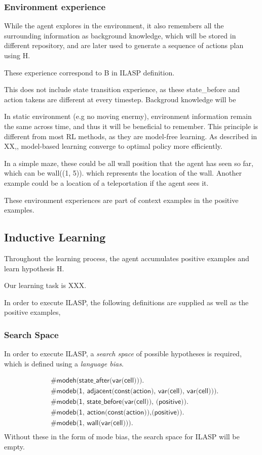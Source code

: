 \subsubsection{Environment experience}

While the agent explores in the environment, it also remembers all the surrounding information as background knowledge, 
which will be stored in different repository, and are later used to generate a sequence of actions plan using H.

These experience correspond to B in ILASP definition. 

This does not include state transition experience, as these state\_before and action takens are different at every timestep.
Backgroud knowledge will be 

In static environment (e.g no moving enermy), environment information remain the same across time, and thus it will be beneficial to remember. 
This principle is different from most RL methods, as they are model-free learning. 
As described in XX,, model-based learning converge to optimal policy more efficiently. 

In a simple maze, these could be all wall position that the agent has seen so far, which can be 
wall((1, 5)). which represents the location of the wall. 
Another example could be a location of a teleportation if the agent sees it. 

These environment experiences are part of context examples in the positive examples. 

\subsection{Inductive Learning}
\label{induction}
Throughout the learning process, the agent accumulates positive examples and learn hypothesis H. 

Our learning task is XXX.

In order to execute ILASP, the following definitions are supplied as well as the positive examples,

\subsubsection{Search Space}
In order to execute ILASP, a \textit{search space} of possible hypotheses is required, which is defined using a \textit{language bias}. 

\begin{equation}
\begin{split}    
&\textsf{\#modeh(state\_after(var(cell))).}\\
&\textsf{\#modeb(1, adjacent(const(action), var(cell), var(cell))).} \\
&\textsf{\#modeb(1, state\_before(var(cell)), (positive)).} \\
&\textsf{\#modeb(1, action(const(action)),(positive)).} \\
&\textsf{\#modeb(1, wall(var(cell))).} \\
\end{split}
\end{equation}
Without these in the form of mode bias, the search space for ILASP will be empty. 


